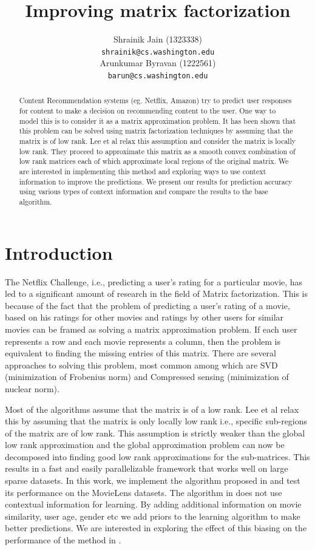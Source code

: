 \documentclass[10 pt,table]{article}  %
\title{Improving matrix factorization}
\author{
Shrainik Jain (1323338)\\
\texttt{shrainik@cs.washington.edu} \\
\And
Arunkumar Byravan (1222561) \\
\texttt{barun@cs.washington.edu} \\
}
\begin{document}
\maketitle

\begin{abstract}
Content Recommendation systems (eg. Netflix, Amazon) try to predict user responses for content to make a decision on recommending content to the user. One way to model this is to consider it as a matrix approximation problem. It has been shown that this problem can be solved using matrix factorization techniques by assuming that the matrix is of low rank. Lee et al \cite{lee2013local} relax this assumption and consider the matrix is locally low rank. They proceed to approximate this matrix as a smooth convex combination of low rank matrices each of which approximate local regions of the original matrix. We are interested in implementing this method and exploring ways to use context information to improve the predictions. We present our results for prediction accuracy using various types of context information and compare the results to the base algorithm.
\end{abstract}

\section{Introduction}
The Netflix Challenge, i.e., predicting a user's rating for a particular movie, has led to a significant amount of research in the field of Matrix factorization. This is because of the fact that the problem of predicting a user's rating of a movie, based on his ratings for other movies and ratings by other users for similar movies can be framed as solving a matrix approximation problem. If each user represents a row and each movie represents a column, then the problem is equivalent to finding the missing entries of this matrix. There are several approaches to solving this problem, most common among which are SVD \cite{paterek2007improving} (minimization of Frobenius norm) and Compressed sensing (minimization of nuclear norm). 

Most of the algorithms assume that the matrix is of a low rank. Lee et al \cite{lee2013local} relax this by assuming that the matrix is only locally low rank i.e., specific sub-regions of the matrix are of low rank. This assumption is strictly weaker than the global low rank approximation and the global approximation problem can now be decomposed into finding good low rank approximations for the sub-matrices. This results in a fast and easily parallelizable framework that works well on large sparse datasets. In this work, we implement the algorithm proposed in \cite{lee2013local} and test its performance on the MovieLens datasets. The algorithm in \cite{lee2013local} does not use contextual information for learning. By adding additional information on movie similarity, user age, gender etc we add priors to the learning algorithm to make better predictions. We are interested in exploring the effect of this biasing on the performance of the method in \cite{lee2013local}.
\end{document}
